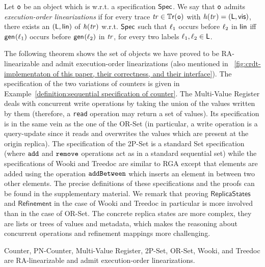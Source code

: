 \begin{definition}\label{def:exec_order}
  Let $\mathtt{o}$ be an object which is \crdtlinearizable{} w.r.t. a specification $\mathsf{Spec}$. We say that $\mathtt{o}$ admits \emph{execution-order linearizations} if for every trace $\mathit{tr}\in\mathbb{T}\mathsf{r}(\mathtt{o})$ with $\mathit{h}({\mathit{tr})}=(\mathsf{L},\mathsf{vis})$, there exists an \crdtlinearization{} $(\mathsf{L},\mathsf{lin})$ of $\mathit{h}({\mathit{tr})}$ w.r.t. $\mathsf{Spec}$ such that $\ell_1$ occurs before $\ell_2$ in $\mathsf{lin}$ iff $\mathsf{gen}_{}(\ell_1)$ occurs before $\mathsf{gen}_{}(\ell_2)$ in $\mathit{tr}$, for every two labels $\ell_1,\ell_2\in\mathsf{L}$.
\end{definition}

The following theorem shows the set of objects we have proved to be
RA-linearizable and admit execution-order linearizations (also
mentioned in \figureautorefname~\ref{fig:crdt-implementaton of this paper, their
  correctness, and their interface}). The specification of the two
variations of counters is given in Example~\ref{definition:sequential
  specification of counter}. The Multi-Value Register deals with
concurrent write operations by taking the union of the values written
by them (therefore, a {\tt read} operation may return a set of
values).
Its specification is in the same vein as the one of the OR-Set (in particular, a write operation is a query-update since it reads and overwrites the values which are present at the origin replica). The specification of the 2P-Set is a standard Set specification (where ${\tt add}$ and ${\tt remove}$ operations act as in a standard sequential set) while the specifications of Wooki and Treedoc are similar to RGA except that elements are added using the operation ${\tt addBetween}$ which inserts an element in between two other elements. The precise definitions of these specifications and the proofs can be found in the supplementary material. We remark that proving $\mathsf{ReplicaStates}$ and $\mathsf{Refinement}$ in the case of Wooki and Treedoc in particular is more involved than in the case of OR-Set. The concrete replica states are more complex, they are lists or trees of values and metadata, which makes the reasoning about concurrent operations and refinement mappings more challenging.
\begin{theorem}\label{th:execution_order_objects}
Counter, PN-Counter, Multi-Value Register, 2P-Set, OR-Set, Wooki, and Treedoc are RA-linearizable and admit execution-order linearizations.
\end{theorem}


